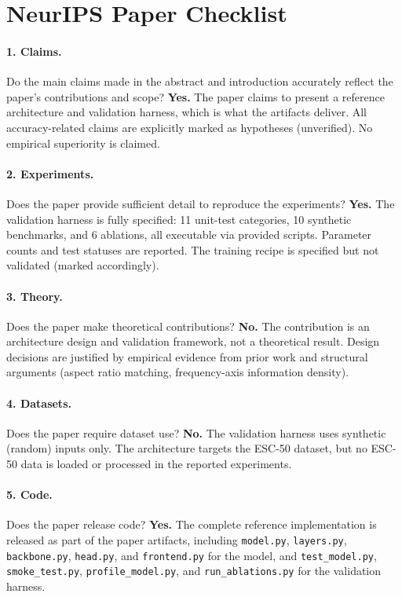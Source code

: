 \documentclass{article}
\begin{document}
\newpage
\section*{NeurIPS Paper Checklist}

\paragraph{1. Claims.}
Do the main claims made in the abstract and introduction accurately reflect the
paper's contributions and scope?
\textbf{Yes.} The paper claims to present a reference architecture and
validation harness, which is what the artifacts deliver. All accuracy-related
claims are explicitly marked as hypotheses (unverified). No empirical
superiority is claimed.

\paragraph{2. Experiments.}
Does the paper provide sufficient detail to reproduce the experiments?
\textbf{Yes.} The validation harness is fully specified: 11 unit-test categories,
10 synthetic benchmarks, and 6 ablations, all executable via provided scripts.
Parameter counts and test statuses are reported. The training recipe is
specified but not validated (marked accordingly).

\paragraph{3. Theory.}
Does the paper make theoretical contributions?
\textbf{No.} The contribution is an architecture design and validation framework,
not a theoretical result. Design decisions are justified by empirical evidence
from prior work and structural arguments (aspect ratio matching, frequency-axis
information density).

\paragraph{4. Datasets.}
Does the paper require dataset use?
\textbf{No.} The validation harness uses synthetic (random) inputs only. The
architecture targets the ESC-50 dataset, but no ESC-50 data is loaded or
processed in the reported experiments.

\paragraph{5. Code.}
Does the paper release code?
\textbf{Yes.} The complete reference implementation is released as part of the
paper artifacts, including \texttt{model.py}, \texttt{layers.py},
\texttt{backbone.py}, \texttt{head.py}, and \texttt{frontend.py} for the
model, and \texttt{test\_model.py}, \texttt{smoke\_test.py},
\texttt{profile\_model.py}, and \texttt{run\_ablations.py} for the validation
harness.
\end{document}
